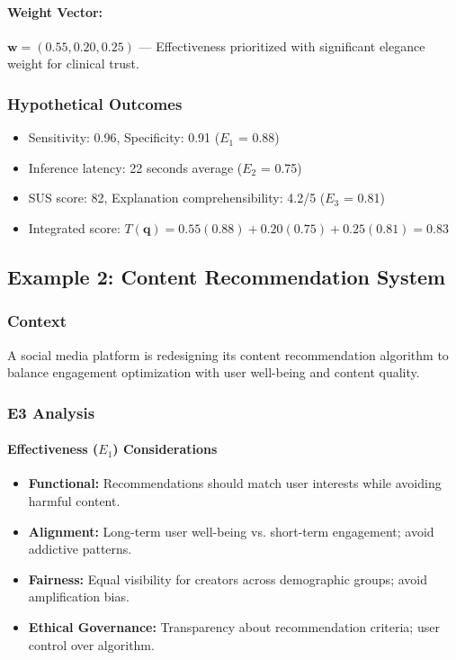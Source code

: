 \paragraph{Weight Vector:} $\mathbf{w} = (0.55, 0.20, 0.25)$ — Effectiveness prioritized with significant elegance weight for clinical trust.

\subsubsection{Hypothetical Outcomes}

\begin{itemize}[leftmargin=2em]
    \item Sensitivity: 0.96, Specificity: 0.91 ($E_1$ = 0.88)
    \item Inference latency: 22 seconds average ($E_2$ = 0.75)
    \item SUS score: 82, Explanation comprehensibility: 4.2/5 ($E_3$ = 0.81)
    \item Integrated score: $T(\mathbf{q}) = 0.55(0.88) + 0.20(0.75) + 0.25(0.81) = 0.83$
\end{itemize}

\subsection{Example 2: Content Recommendation System}

\subsubsection{Context}

A social media platform is redesigning its content recommendation algorithm to balance engagement optimization with user well-being and content quality.

\subsubsection{E3 Analysis}

\paragraph{Effectiveness ($E_1$) Considerations}

\begin{itemize}[leftmargin=2em]
    \item \textbf{Functional:} Recommendations should match user interests while avoiding harmful content.
    \item \textbf{Alignment:} Long-term user well-being vs. short-term engagement; avoid addictive patterns.
    \item \textbf{Fairness:} Equal visibility for creators across demographic groups; avoid amplification bias.
    \item \textbf{Ethical Governance:} Transparency about recommendation criteria; user control over algorithm.
\end{itemize}

